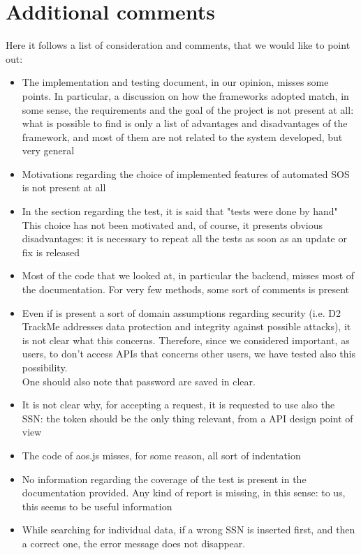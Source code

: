 \section{Additional comments}
Here it follows a list of consideration and comments, that we would like to point out:
\begin{itemize}
\item The implementation and testing document, in our opinion, misses some points. 
In particular, a discussion on how the frameworks adopted match, in some sense, the requirements and the goal of the project 
is not present at all: what is possible to find is only a list of advantages and disadvantages of the framework, and most of them are not
related to the system developed, but very general
\item Motivations regarding the choice of implemented features of automated SOS is not present at all
\item In the section regarding the test, it is said that "tests were done by hand"
This choice has not been motivated and, of course, it presents obvious disadvantages: it is necessary to repeat all the tests as soon as
an update or fix is released
\item Most of the code that we looked at, in particular the backend, misses most of the documentation. For very few methods, some sort
of comments is present
\item Even if is present a sort of domain assumptions regarding security (i.e. D2 TrackMe addresses data protection and integrity against
possible attacks), it is not clear what this concerns. Therefore, since we considered important, as users, to don't access APIs that
concerns other users, we have tested also this possibility. \\
One should also note that password are saved in clear.
\item It is not clear why, for accepting a request, it is requested to use also the SSN: the token should be the only thing relevant, from a
API design point of view
\item The code of aos.js misses, for some reason, all sort of indentation
\item No information regarding the coverage of the test is present in the documentation provided. 
Any kind of report is missing, in this sense: to us, this seems to be useful information
\item While searching for individual data, if a wrong SSN is inserted first, and then 
a correct one, the error message does not disappear. 


\end{itemize}
